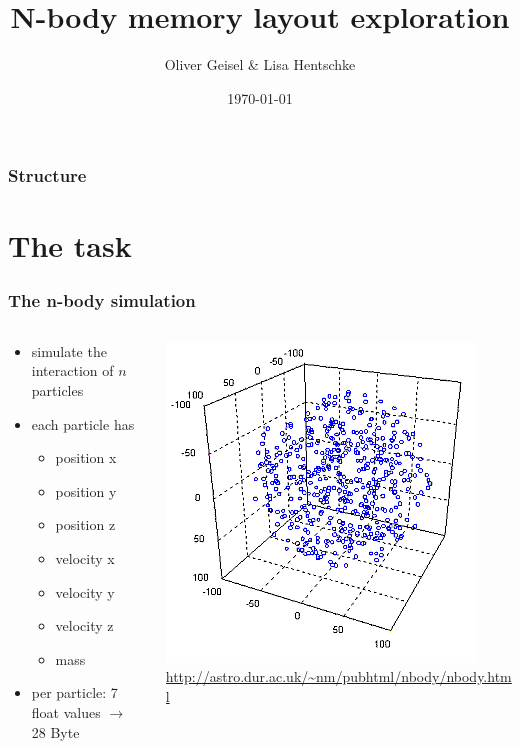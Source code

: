 \documentclass[aspectratio=169]{beamer}
\title{N-body memory layout exploration}
\author{Oliver Geisel \& Lisa Hentschke}
\date{\today}
\begin{document}
\begin{frame}
	\titlepage
\end{frame}

\begin{frame}
	\frametitle{Structure}
	\tableofcontents
\end{frame}

\section{The task} 
\begin{frame}
	\frametitle{The n-body simulation}
	\begin{columns}
	\begin{column}{0.55\textwidth}
		\begin{itemize}
			\item simulate the interaction of \(n\) particles
			\item each particle has
			\begin{itemize}
				\smallskip
				\item position x
				\item position y
				\item position z
				\smallskip
				\item velocity x
				\item velocity y
				\item velocity z
				\smallskip
				\item mass
			\end{itemize}
			\item per particle: 7 float values \(\rightarrow\) 28 Byte
		\end{itemize}
	\end{column}
	
	\begin{column}{0.45\textwidth}
		\includegraphics[scale=0.65]{resources/nbody.png}
		\tiny \url{http://astro.dur.ac.uk/~nm/pubhtml/nbody/nbody.html}
	\end{column}
	
	\end{columns}
	
\end{frame}
\end{document}
